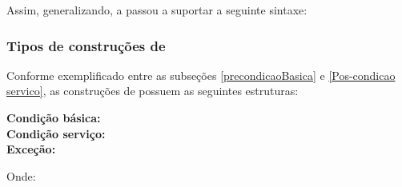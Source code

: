  Assim, generalizando, a \neoidl{} passou a suportar a seguinte sintaxe:
 
\begin{center}
\begin{footnotesize}
\end{footnotesize}
\end{center}
 

\subsubsection{Tipos de construções de \designbycontract{}}
\label{TiposContrDbC}

Conforme exemplificado entre as subseções \ref{precondicaoBasica} e
\ref{Pos-condicao servico}, as construções de \designbycontract{} possuem as
seguintes estruturas:

\begin{center}
\begin{footnotesize}
\textbf{Condição básica:}
\\
\vspace{3mm}
\textbf{Condição serviço:}
\\
\vspace{3mm}
\textbf{Exceção:}\\
\end{footnotesize}
\end{center}

Onde:

